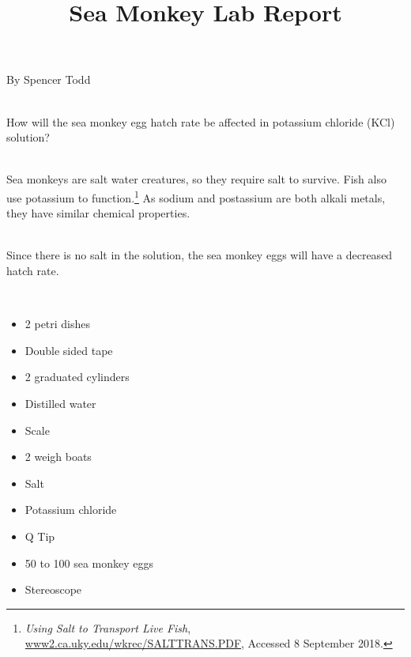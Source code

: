 \documentclass[12pt]{article}
\begin{document}
\title{Sea Monkey Lab Report}{By Spencer Todd}\double

\\
How will the sea monkey egg hatch rate be affected in potassium chloride (KCl) solution?\double

\\
Sea monkeys are salt water creatures, so they require salt to survive. Fish also use potassium to function.\footnote{\textit{Using Salt to Transport Live Fish}, \url{www2.ca.uky.edu/wkrec/SALTTRANS.PDF}, Accessed 8 September 2018.} As sodium and postassium are both alkali metals, they have similar chemical properties.\double

\\
Since there is no salt in the solution, the sea monkey eggs will have a decreased hatch rate.\double

\\
\begin{itemize}
    \item 2 petri dishes
    \item Double sided tape
    \item 2 graduated cylinders
    \item Distilled water
    \item Scale
    \item 2 weigh boats
    \item Salt
    \item Potassium chloride
    \item Q Tip
    \item 50 to 100 sea monkey eggs
    \item Stereoscope
\end{itemize}
\end{document}
